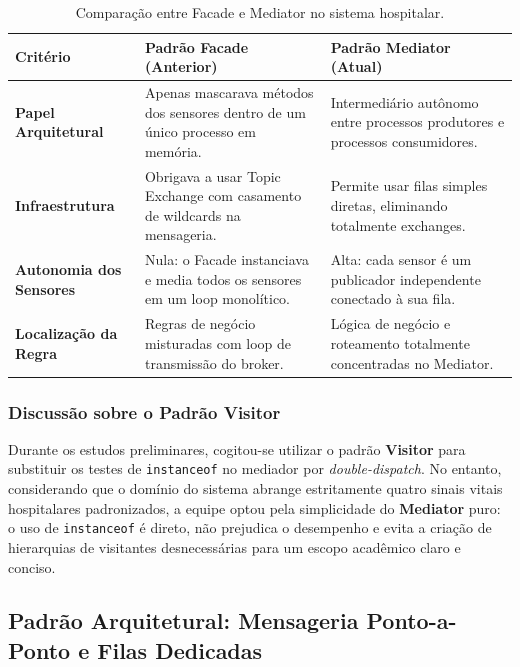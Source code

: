 \documentclass[12pt,a4paper]{article}
\begin{document}
\begin{table}[h!]
\centering
\small
\begin{tabular}{p{4.2cm}p{5.5cm}p{5.5cm}}
\toprule
\textbf{Critério} & \textbf{Padrão Facade (Anterior)} & \textbf{Padrão Mediator (Atual)} \\
\midrule
\textbf{Papel Arquitetural} & Apenas mascarava métodos dos sensores dentro de um único processo em memória. & Intermediário autônomo entre processos produtores e processos consumidores. \\
\textbf{Infraestrutura} & Obrigava a usar Topic Exchange com casamento de wildcards na mensageria. & Permite usar filas simples diretas, eliminando totalmente exchanges. \\
\textbf{Autonomia dos Sensores} & Nula: o Facade instanciava e media todos os sensores em um loop monolítico. & Alta: cada sensor é um publicador independente conectado à sua fila. \\
\textbf{Localização da Regra} & Regras de negócio misturadas com loop de transmissão do broker. & Lógica de negócio e roteamento totalmente concentradas no Mediator. \\
\bottomrule
\end{tabular}
\caption{Comparação entre Facade e Mediator no sistema hospitalar.}
\label{tab:facade_vs_mediator}
\end{table}

\subsubsection{Discussão sobre o Padrão Visitor}
Durante os estudos preliminares, cogitou-se utilizar o padrão \textbf{Visitor} para substituir os testes de \texttt{instanceof} no mediador por \textit{double-dispatch}. No entanto, considerando que o domínio do sistema abrange estritamente quatro sinais vitais hospitalares padronizados, a equipe optou pela simplicidade do \textbf{Mediator} puro: o uso de \texttt{instanceof} é direto, não prejudica o desempenho e evita a criação de hierarquias de visitantes desnecessárias para um escopo acadêmico claro e conciso.

\subsection{Padrão Arquitetural: Mensageria Ponto-a-Ponto e Filas Dedicadas}
\end{document}
